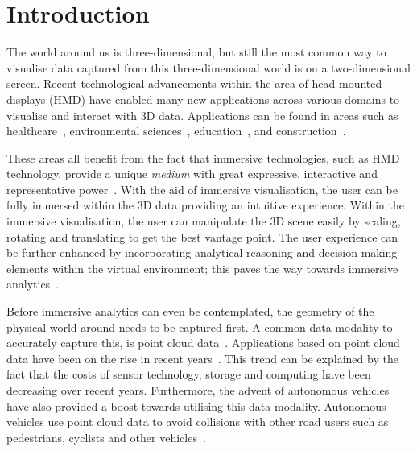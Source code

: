 \section{Introduction}
The world around us is three-dimensional, but still the most common way to visualise data captured from this three-dimensional world is on a two-dimensional screen. Recent technological advancements within the area of head-mounted displays (HMD) have enabled many new applications across various domains to visualise and interact with 3D data. Applications can be found in areas such as healthcare~\cite{Buettner20}, environmental sciences~\cite{Rambach21}, education~\cite{FreinaOtt}, and construction~\cite{WangP18}.

These areas all benefit from the fact that immersive technologies, such as HMD technology, provide a unique \emph{medium} with great expressive, interactive and representative power~\cite{Rubio17}. With the aid of immersive visualisation, the user can be fully immersed within the 3D data providing an intuitive experience. Within the immersive visualisation, the user can manipulate the 3D scene easily by scaling, rotating and translating to get the best vantage point. The user experience can be further enhanced by incorporating analytical reasoning and decision making elements within the virtual environment; this paves the way towards immersive analytics~\cite{Chandler15}.

Before immersive analytics can even be contemplated, the geometry of the physical world around needs to be captured first. A common data modality to accurately capture this, is point cloud data~\cite{Barber08}. Applications based on point cloud data have been on the rise in recent years~\cite{WangYanyun19, wang2019Applications}. This trend can be explained by the fact that the costs of sensor technology, storage and computing have been decreasing over recent years. Furthermore, the advent of autonomous vehicles have also provided a boost towards utilising this data modality. Autonomous vehicles use point cloud data to avoid collisions with other road users such as pedestrians, cyclists and other vehicles~\cite{LiIbanez20}.

